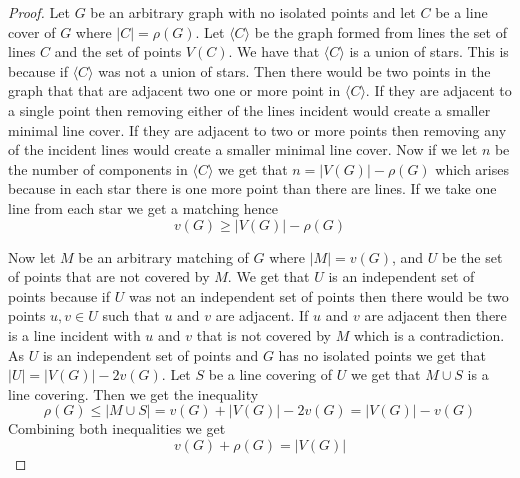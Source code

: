 \documentclass[12pt]{article}
\begin{document}
\begin{proof}
    Let $G$ be an arbitrary graph with no isolated points and let $C$ be a line cover of $G$ where $|C|=\rho(G)$. Let $\langle C \rangle$ be the graph formed from lines the set of lines $C$ and the set of points $V(C)$. We have that $\langle C \rangle$ is a union of stars. This is because if $\langle C \rangle$ was not a union of stars. Then there would be two points in the graph that that are adjacent two one or more point in $\langle C \rangle$. If they are adjacent to a single point then removing either of the lines incident would create a smaller minimal line cover. If they are adjacent to two or more points then removing any of the incident lines would create a smaller minimal line cover.
    Now if we let $n$ be the number of components in $\langle C \rangle$ we get that $n=|V(G)|-\rho(G)$ which arises because in each star there is one more point than there are lines. If we take one line from each star we get a matching hence $$v(G)\geq |V(G)| - \rho(G)$$

    Now let $M$ be an arbitrary matching of $G$ where $|M|=v(G)$, and $U$ be the set of points that are not covered by $M$. We get that $U$ is an independent set of points because if $U$ was not an independent set of points then there would be two points $u,v \in U$ such that $u$ and $v$ are adjacent. If $u$ and $v$ are adjacent then there is a line incident with $u$ and $v$ that is not covered by $M$ which is a contradiction. As $U$ is an independent set of points and $G$ has no isolated points we get that $|U| = |V(G)|-2v(G)$. Let $S$ be a line covering of $U$ we get that $M\cup S$ is a line covering. Then we get the inequality $$\rho (G)\leq |M \cup S|= v(G)+|V(G)|-2v(G)=|V(G)|-v(G)$$ Combining both inequalities we get $$v(G)+\rho(G)=|V(G)|$$
\end{proof}
\end{document}
